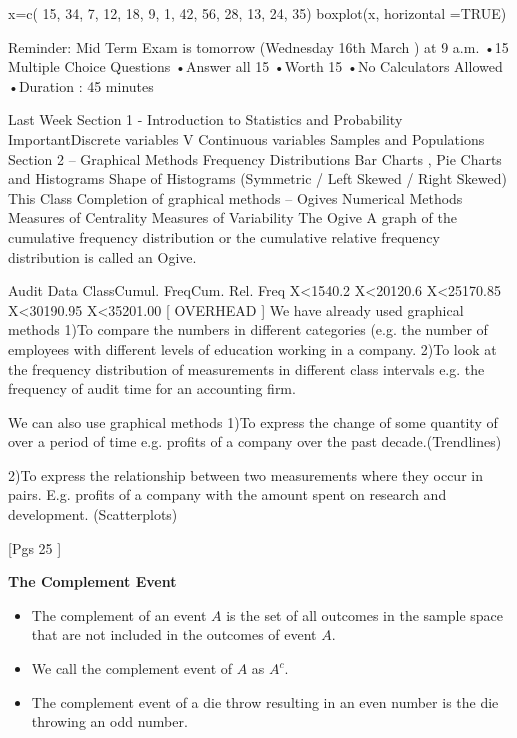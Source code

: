 \documentclass[]{report}
\begin{document}
{{{{{x=c( 15,  34,  7,  12,  18,  9, 1,  42,  56,  28,  13,  24, 35)
boxplot(x, horizontal =TRUE)


Reminder: Mid Term Exam is tomorrow (Wednesday 16th March ) at 9 a.m.
•15 Multiple Choice Questions
•Answer all 15
•Worth 15%
•No Calculators Allowed
•Duration : 45 minutes

Last Week
Section 1  - Introduction to Statistics and Probability
ImportantDiscrete variables V Continuous variables
Samples and Populations
Section 2 – Graphical Methods
Frequency Distributions
Bar Charts , Pie Charts and Histograms
Shape of Histograms (Symmetric / Left Skewed  / Right Skewed)
This Class
Completion of graphical methods – Ogives
Numerical Methods
Measures of Centrality
Measures of Variability
The Ogive
A  graph of the cumulative frequency distribution or the cumulative relative frequency distribution is called an Ogive.

Audit Data
ClassCumul. FreqCum. Rel. Freq
X<1540.2
X<20120.6
X<25170.85
X<30190.95
X<35201.00
[ OVERHEAD ]
We have already used graphical methods
1)To compare the numbers in different categories (e.g. the number of employees with different levels of education working in a company.
2)To look at the frequency distribution of measurements in different class intervals e.g. the frequency of audit time for an accounting firm.

We can also use graphical methods
1)To express the change of some quantity of over a period of time e.g. profits of a company over the past decade.(Trendlines)

2)To express the relationship between two measurements where they occur in pairs. E.g. profits of a company with the amount spent on research and development. (Scatterplots)

[Pgs 25 ]





{
\textbf{The Complement Event}
\begin{itemize}
\item  The complement of an event $A$ is the set of all outcomes in the sample space that are not included in the outcomes of event $A$.  
\item  We call the complement event of $A$ as $A^c$.
\item     
The complement event of a die throw resulting in an even number is the die throwing an odd number.
\end{itemize}
}


}}}}}
\end{document}
